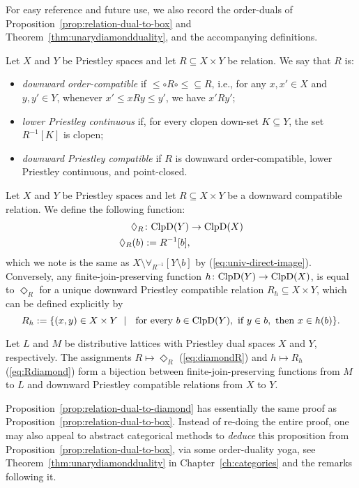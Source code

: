 For easy reference and future use, we also record the order-duals of Proposition~\ref{prop:relation-dual-to-box} and Theorem~\ref{thm:unarydiamondduality}, and the accompanying definitions.
\begin{definition}\label{dfn:downward-compatible}
	Let $X$ and $Y$ be Priestley spaces and let $R \subseteq X \times Y$ be relation. We say that $R$ is: 
	\begin{itemize}
		\item \emph{downward order-compatible} if ${\leq} \circ R \circ {\leq} \subseteq R$, i.e., for any $x, x' \in X$ and $y, y' \in Y$, whenever $x' \leq x {R} y \leq y'$, we have $x' {R} y'$;
		\item \emph{lower Priestley continuous} if, for every clopen down-set $K \subseteq Y$, the set $R^{-1}[K]$ is clopen; 
		\item \emph{downward Priestley compatible} if $R$ is downward order-compatible, lower Priestley continuous, and point-closed.
	\end{itemize}
\end{definition}
Let $X$ and $Y$ be Priestley spaces and let $R \subseteq X \times Y$ be a downward compatible relation. We define the following function: 
\begin{align}\label{eq:diamondR} 
  \Diamond_R &\colon \mathrm{ClpD}(Y) \to \mathrm{ClpD}(X) \nonumber \\
 \Diamond_R(b) &:= R^{-1}[b],
\end{align}
which we note is the same as $X \setminus \forall_{R^{-1}}[Y \setminus b]$ by (\ref{eq:univ-direct-image}). Conversely, any finite-join-preserving function $h \colon \mathrm{ClpD}(Y) \to \mathrm{ClpD}(X)$, is equal to $\Diamond_R$ for a unique downward Priestley compatible relation $R_h \subseteq X \times Y$, which can be defined explicitly by 
\begin{equation}\label{eq:Rdiamond}
R_h := \{(x,y) \in X \times Y \ \mid \ \text{ for every } b \in \mathrm{ClpD}(Y), \text{ if } y \in b, \text{ then } x \in h(b)\}.
\end{equation}

\begin{proposition}\label{prop:relation-dual-to-diamond}
	Let $L$ and $M$ be distributive lattices with Priestley dual spaces $X$ and $Y$, respectively. The assignments $R \mapsto \Diamond_R$ (\ref{eq:diamondR}) and $h \mapsto R_h$ (\ref{eq:Rdiamond}) form a bijection between finite-join-preserving functions from $M$ to $L$ and downward Priestley compatible relations from $X$ to $Y$.
\end{proposition}
Proposition~\ref{prop:relation-dual-to-diamond} has essentially the same proof as Proposition~\ref{prop:relation-dual-to-box}. Instead of re-doing the entire proof, one may also appeal to abstract categorical methods to \emph{deduce} this proposition from Proposition~\ref{prop:relation-dual-to-box}, via some order-duality yoga, see Theorem~\ref{thm:unarydiamondduality} in Chapter~\ref{ch:categories} and the remarks following it.

